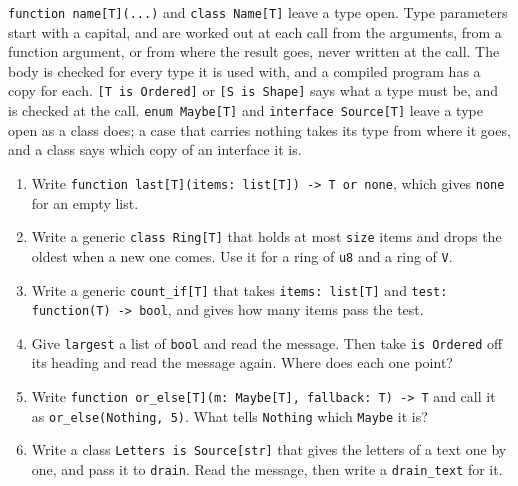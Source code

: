 \begin{summary}
\verb|function name[T](...)| and \verb|class Name[T]| leave a type
open. Type parameters start with a capital, and are worked out at each
call from the arguments, from a function argument, or from where the
result goes, never written at the call. The body is checked for every
type it is used with, and a compiled program has a copy for each.
\verb|[T is Ordered]| or \verb|[S is Shape]| says what a type must be,
and is checked at the call. \verb|enum Maybe[T]| and
\verb|interface Source[T]| leave a type open as a class does; a case
that carries nothing takes its type from where it goes, and a class
says which copy of an interface it is.
\end{summary}

\begin{tryit}
\begin{enumerate}
\item Write \verb|function last[T](items: list[T]) -> T or none|,
  which gives \verb|none| for an empty list.
\item Write a generic \verb|class Ring[T]| that holds at most
  \verb|size| items and drops the oldest when a new one comes. Use it
  for a ring of \verb|u8| and a ring of \verb|V|.
\item Write a generic \verb|count_if[T]| that takes
  \verb|items: list[T]| and \verb|test: function(T) -> bool|, and
  gives how many items pass the test.
\item Give \verb|largest| a list of \verb|bool| and read the message.
  Then take \verb|is Ordered| off its heading and read the message
  again. Where does each one point?
\item Write \verb|function or_else[T](m: Maybe[T], fallback: T) -> T|
  and call it as \verb|or_else(Nothing, 5)|. What tells \verb|Nothing|
  which \verb|Maybe| it is?
\item Write a class \verb|Letters is Source[str]| that gives the
  letters of a text one by one, and pass it to \verb|drain|. Read the
  message, then write a \verb|drain_text| for it.
\end{enumerate}
\end{tryit}

